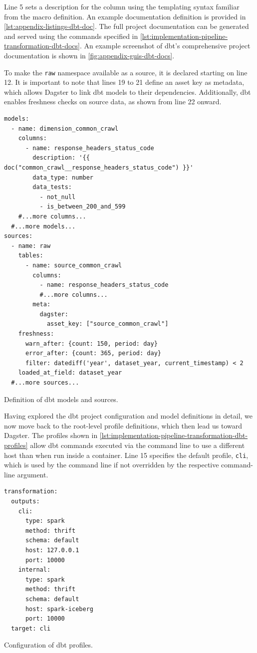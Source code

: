 Line 5 sets a description for the column using the templating syntax familiar from the macro definition.
An example documentation definition is provided in \cref{lst:appendix-listings-dbt-doc}.
The full project documentation can be generated and served using the commands specified in \cref{lst:implementation-pipeline-transformation-dbt-docs}.
An example screenshot of dbt's comprehensive project documentation is shown in \cref{fig:appendix-guis-dbt-docs}.

To make the \texttt{raw} namespace available as a source, it is declared starting on line 12.
It is important to note that lines 19 to 21 define an asset key as metadata, which allows Dagster to link dbt models to their dependencies.
Additionally, dbt enables freshness checks on source data, as shown from line 22 onward.

\begin{listing}[H]
\begin{verbatim}
models:
  - name: dimension_common_crawl
    columns:
      - name: response_headers_status_code
        description: '{{ doc("common_crawl__response_headers_status_code") }}'
        data_type: number
        data_tests:
          - not_null
          - is_between_200_and_599
    #...more columns...
  #...more models...
sources:
  - name: raw
    tables:
      - name: source_common_crawl
        columns:
          - name: response_headers_status_code
          #...more columns...
        meta:
          dagster:
            asset_key: ["source_common_crawl"]
    freshness:
      warn_after: {count: 150, period: day}
      error_after: {count: 365, period: day}
      filter: datediff('year', dataset_year, current_timestamp) < 2
    loaded_at_field: dataset_year
  #...more sources...
\end{verbatim}
\caption{Definition of dbt models and sources.}
\label{lst:implementation-pipeline-transformation-dbt-models}
\end{listing}

Having explored the dbt project configuration and model definitions in detail, we now move back to the root-level profile definitions, which then lead us toward Dagster.
The profiles shown in \cref{lst:implementation-pipeline-transformation-dbt-profiles} allow dbt commands executed via the command line to use a different host than when run inside a container.
Line 15 specifies the default profile, \texttt{cli}, which is used by the command line if not overridden by the respective command-line argument.

\begin{listing}[H]
\begin{verbatim}
transformation:
  outputs:
    cli:
      type: spark
      method: thrift
      schema: default
      host: 127.0.0.1
      port: 10000
    internal:
      type: spark
      method: thrift
      schema: default
      host: spark-iceberg
      port: 10000
  target: cli
\end{verbatim}
\caption{Configuration of dbt profiles.}
\label{lst:implementation-pipeline-transformation-dbt-profiles}
\end{listing}


